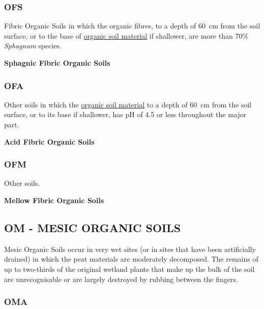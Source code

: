 \documentclass[
  letterpaper,
  DIV=11,
  numbers=noendperiod]{scrreprt}
\begin{document}
\hypertarget{sec-key-OFS}{%
\subsubsection{\texorpdfstring{\textbf{OFS}}{OFS}}\label{sec-key-OFS}}

Fibric Organic Soils in which the organic fibres, to a depth of 60~cm
from the soil surface, or to the base of
\protect\hyperlink{sec-diag-org}{organic soil material} if shallower,
are more than 70\% \emph{Sphagnum} species.

\textbf{Sphagnic Fibric Organic Soils}

\hypertarget{sec-key-OFA}{%
\subsubsection{\texorpdfstring{\textbf{OFA}}{OFA}}\label{sec-key-OFA}}

Other soils in which the \protect\hyperlink{sec-diag-org}{organic soil
material} to a depth of 60~cm from the soil surface, or to its base if
shallower, has pH of 4.5 or less throughout the major part.

\textbf{Acid Fibric Organic Soils}

\hypertarget{sec-key-OFM}{%
\subsubsection{\texorpdfstring{\textbf{OFM}}{OFM}}\label{sec-key-OFM}}

Other soils.

\textbf{Mellow Fibric Organic Soils}

\hypertarget{sec-OM}{%
\subsection{\texorpdfstring{\textbf{OM} - MESIC ORGANIC
SOILS}{OM - MESIC ORGANIC SOILS}}\label{sec-OM}}

Mesic Organic Soils occur in very wet sites (or in sites that have been
artificially drained) in which the peat materials are moderately
decomposed. The remains of up to two-thirds of the original wetland
plants that make up the bulk of the soil are unrecognisable or are
largely destroyed by rubbing between the fingers.

\hypertarget{sec-key-OMA}{%
\subsubsection{\texorpdfstring{\textbf{OMA}}{OMA}}\label{sec-key-OMA}}
\end{document}
